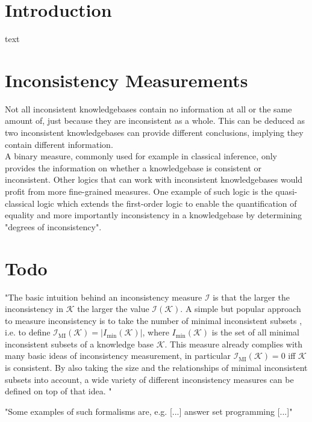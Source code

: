 \section{Introduction}
text

\section{Inconsistency Measurements}
Not all inconsistent knowledgebases contain no information at all or the same amount of, just because they are inconsistent as a whole. This can be deduced as two inconsistent knowledgebases can provide different conclusions, implying they contain different information. \cite{bertossi_approaches_2005}\\
A binary measure, commonly used for example in classical inference, only provides the information on whether a knowledgebase is consistent or inconsistent. Other logics that can work with inconsistent knowledgebases would profit from more fine-grained measures.
One example of such logic is the quasi-classical logic \cite{grant_measuring_2006} which extends the first-order logic to enable the quantification of equality and more importantly inconsistency in a knowledgebase by determining "degrees of inconsistency".


\section{Todo}

"The basic intuition behind an inconsistency measure \(\mathcal{I}\) is that the larger the inconsistency in \(\mathcal{K}\) the larger the value \(\mathcal{I}(\mathcal{K})\). A simple but popular approach to measure inconsistency is to take the number of minimal inconsistent subsets \cite{hunter_measuring_2008}, i.e. to define \(\mathcal{I}_{\text{MI}}(\mathcal{K}) = \left| I_{\min}(\mathcal{K}) \right|\), where \(I_{\min}(\mathcal{K})\) is the set of all minimal inconsistent subsets of a knowledge base \(\mathcal{K}\). This measure already complies with many basic ideas of inconsistency measurement, in particular \(\mathcal{I}_{\text{MI}}(\mathcal{K})=0\) iff \(\mathcal{K}\) is consistent. By also taking the size and the relationships of minimal inconsistent subsets into account, a wide variety of different inconsistency measures can be defined on top of that idea. \cite{hunter_measuring_2008} \cite{jabbour_mis_2016}"

"Some examples of such formalisms are, e.g. [...] answer set programming \cite{gelfond_logic_2002} [...]"


